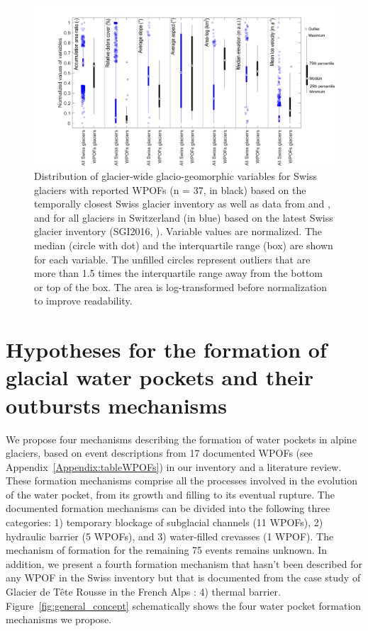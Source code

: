 \begin{figure}
    \centering
    \includegraphics[width=1\linewidth]{chapters/chapter_WPOFs/geomorpho_variables.pdf}
    \caption{Distribution of glacier-wide glacio-geomorphic variables for Swiss glaciers with reported WPOFs (n = 37, in black) based on the temporally closest  Swiss glacier inventory \citep{Muller&al1976, Maisch&al2000, Linsbauer&al2021} as well as data from \cite{Altrock2022} and \cite{Millan&al2022}, and for all glaciers in Switzerland (in blue) based on the latest Swiss glacier inventory (SGI2016, \citet{Linsbauer&al2021}). Variable values are normalized. The median (circle with dot) and the interquartile range (box) are shown for each variable. The unfilled circles represent outliers that are more than 1.5 times the interquartile range away from the bottom or top of the box. The area is log-transformed before normalization to improve readability.}
    \label{fig:distribution_geo}
\end{figure}




\section{ Hypotheses for the formation of glacial water pockets and their outbursts mechanisms}
\label{sec:mechanisms}

We propose four mechanisms describing the formation of water pockets in alpine glaciers, based on event descriptions from 17 documented WPOFs (see Appendix~\ref{Appendix:tableWPOFs}) in our inventory and a literature review. These formation mechanisms comprise all the processes involved in the evolution of the water pocket, from its growth and filling to its eventual rupture. The documented formation mechanisms can be divided into the following three categories: 1) temporary blockage of subglacial channels (11 WPOFs), 2) hydraulic barrier (5 WPOFs), and 3) water-filled crevasses (1 WPOF). The mechanism of formation for the remaining 75 events remains unknown. In addition, we present a fourth formation mechanism that hasn't been described for any WPOF in the Swiss inventory but that is documented from the case study of Glacier de Tête Rousse in the French Alps \citep{Vincent&al2010b}: 4) thermal barrier. Figure~\ref{fig:general_concept} schematically shows the four water pocket formation mechanisms we propose. 




